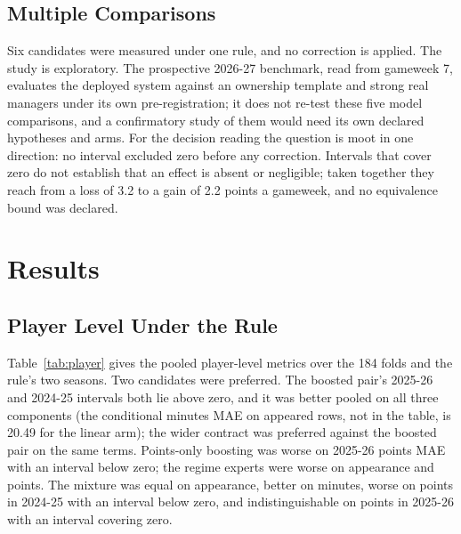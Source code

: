\documentclass[11pt,a4paper]{article}
\begin{document}
\subsection{Multiple Comparisons}

Six candidates were measured under one rule, and no correction is applied. The study is exploratory. The prospective 2026-27 benchmark, read from gameweek 7, evaluates the deployed system against an ownership template and strong real managers under its own pre-registration; it does not re-test these five model comparisons, and a confirmatory study of them would need its own declared hypotheses and arms. For the decision reading the question is moot in one direction: no interval excluded zero before any correction. Intervals that cover zero do not establish that an effect is absent or negligible; taken together they reach from a loss of 3.2 to a gain of 2.2 points a gameweek, and no equivalence bound was declared.

\section{Results}
\label{sec:results}

\subsection{Player Level Under the Rule}

Table~\ref{tab:player} gives the pooled player-level metrics over the 184 folds and the rule's two seasons. Two candidates were preferred. The boosted pair's 2025-26 and 2024-25 intervals both lie above zero, and it was better pooled on all three components (the conditional minutes MAE on appeared rows, not in the table, is 20.49 for the linear arm); the wider contract was preferred against the boosted pair on the same terms. Points-only boosting was worse on 2025-26 points MAE with an interval below zero; the regime experts were worse on appearance and points. The mixture was equal on appearance, better on minutes, worse on points in 2024-25 with an interval below zero, and indistinguishable on points in 2025-26 with an interval covering zero.
\end{document}
